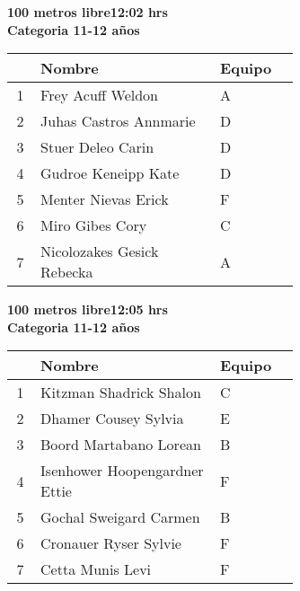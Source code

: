 \begin{minipage}{0.95\linewidth}\vspace{0.5cm} 
\begin{flushleft}
\textbf{
\hspace{-0.15cm}100 metros libre\hspace{1.5cm}12:02 hrs \\Categoria 11-12 años}\vspace{-0.2cm} 
\end{flushleft}
\begin{tabular}{cp{0.63\linewidth}l}
\hline
& \textbf{Nombre} & \textbf{Equipo} \\ \hline
1 & Frey Acuff Weldon & A \\ 
2 & Juhas Castros Annmarie & D \\ 
3 & Stuer Deleo Carin & D \\ 
4 & Gudroe Keneipp Kate & D \\ 
5 & Menter Nievas Erick & F \\ 
6 & Miro Gibes Cory & C \\ 
7 & Nicolozakes Gesick Rebecka & A \\ 
\end{tabular}
\end{minipage}
\begin{minipage}{0.95\linewidth}\vspace{0.5cm} 
\begin{flushleft}
\textbf{
\hspace{-0.15cm}100 metros libre\hspace{1.5cm}12:05 hrs \\Categoria 11-12 años}\vspace{-0.2cm} 
\end{flushleft}
\begin{tabular}{cp{0.63\linewidth}l}
\hline
& \textbf{Nombre} & \textbf{Equipo} \\ \hline
1 & Kitzman Shadrick Shalon & C \\ 
2 & Dhamer Cousey Sylvia & E \\ 
3 & Boord Martabano Lorean & B \\ 
4 & Isenhower Hoopengardner Ettie & F \\ 
5 & Gochal Sweigard Carmen & B \\ 
6 & Cronauer Ryser Sylvie & F \\ 
7 & Cetta Munis Levi & F \\ 
\end{tabular}
\end{minipage}
